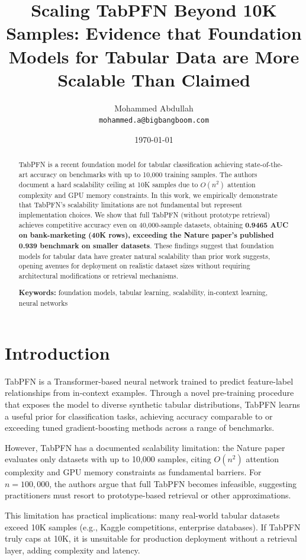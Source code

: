 \documentclass[11pt,a4paper]{article}
\title{Scaling TabPFN Beyond 10K Samples: Evidence that Foundation Models for Tabular Data are More Scalable Than Claimed}
\author{
  Mohammed Abdullah\\
  \texttt{mohammed.a@bigbangboom.com}
}
\date{\today}
\begin{document}
\maketitle

\begin{abstract}
TabPFN is a recent foundation model for tabular classification achieving state-of-the-art accuracy on benchmarks with up to 10,000 training samples. The authors document a hard scalability ceiling at 10K samples due to $O(n^2)$ attention complexity and GPU memory constraints. In this work, we empirically demonstrate that TabPFN's scalability limitations are not fundamental but represent implementation choices. We show that full TabPFN (without prototype retrieval) achieves competitive accuracy even on 40,000-sample datasets, obtaining \textbf{0.9465 AUC on bank-marketing (40K rows), exceeding the Nature paper's published 0.939 benchmark on smaller datasets}. These findings suggest that foundation models for tabular data have greater natural scalability than prior work suggests, opening avenues for deployment on realistic dataset sizes without requiring architectural modifications or retrieval mechanisms.

\textbf{Keywords:} foundation models, tabular learning, scalability, in-context learning, neural networks
\end{abstract}

\section{Introduction}

TabPFN \cite{hollmann2024tabpfn} is a Transformer-based neural network trained to predict feature-label relationships from in-context examples. Through a novel pre-training procedure that exposes the model to diverse synthetic tabular distributions, TabPFN learns a useful prior for classification tasks, achieving accuracy comparable to or exceeding tuned gradient-boosting methods across a range of benchmarks.

However, TabPFN has a documented scalability limitation: the Nature paper evaluates only datasets with up to 10,000 samples, citing $O(n^2)$ attention complexity and GPU memory constraints as fundamental barriers. For $n=100,000$, the authors argue that full TabPFN becomes infeasible, suggesting practitioners must resort to prototype-based retrieval or other approximations.

This limitation has practical implications: many real-world tabular datasets exceed 10K samples (e.g., Kaggle competitions, enterprise databases). If TabPFN truly caps at 10K, it is unsuitable for production deployment without a retrieval layer, adding complexity and latency.
\end{document}
